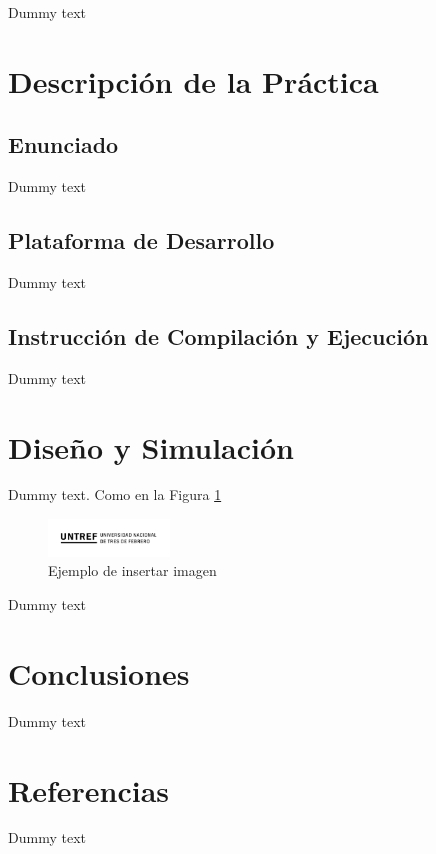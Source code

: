 \documentclass{article}
\begin{document}
Dummy text

\section{Descripción de la Práctica}

\subsection{Enunciado}

Dummy text

\subsection{Plataforma de Desarrollo}

Dummy text

\subsection{Instrucción de Compilación y Ejecución}

Dummy text

\section{Diseño y Simulación}

Dummy text. Como en la Figura \ref{fig:eje}

\clearpage %
\begin{figure}
    \centering
    \includegraphics[height=1cm]{logo.png}
    \caption{Ejemplo de insertar imagen}
    \label{fig:eje}
\end{figure}


Dummy text

\section{Conclusiones}

Dummy text

\section{Referencias}
Dummy text

\appendix
\renewcommand\thesection{Apéndice \Alph{section}}
\section{}

\section{}
\end{document}
